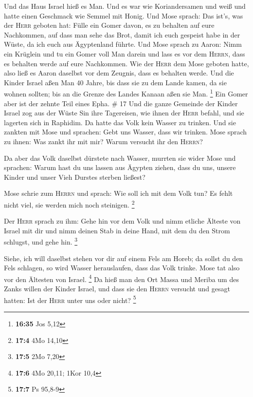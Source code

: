  Und das Haus Israel hieß es Man. Und es war wie
Koriandersamen und weiß und hatte einen Geschmack wie Semmel mit Honig.
 Und Mose sprach: Das ist's, was der \textsc{Herr}
geboten hat: Fülle ein Gomer davon, es zu behalten auf eure Nachkommen,
auf dass man sehe das Brot, damit ich euch gespeist habe in der Wüste,
da ich euch aus Ägyptenland führte.  Und Mose sprach zu
Aaron: Nimm ein Krüglein und tu ein Gomer voll Man darein und lass es
vor dem \textsc{Herrn}, dass es behalten werde auf eure Nachkommen.
 Wie der \textsc{Herr} dem Mose geboten hatte, also ließ
es Aaron daselbst vor dem Zeugnis, dass es behalten werde.
 Und die Kinder Israel aßen Man 40 Jahre, bis dass sie zu
dem Lande kamen, da sie wohnen sollten; bis an die Grenze des Landes
Kanaan aßen sie Man. \footnote{\textbf{16:35} Jos 5,12} 
Ein Gomer aber ist der zehnte Teil eines Epha. \# 17  Und
die ganze Gemeinde der Kinder Israel zog aus der Wüste Sin ihre
Tagereisen, wie ihnen der \textsc{Herr} befahl, und sie lagerten sich in
Raphidim. Da hatte das Volk kein Wasser zu trinken.  Und
sie zankten mit Mose und sprachen: Gebt uns Wasser, dass wir trinken.
Mose sprach zu ihnen: Was zankt ihr mit mir? Warum versucht ihr den
\textsc{Herrn}?

 Da aber das Volk daselbst dürstete nach Wasser, murrten
sie wider Mose und sprachen: Warum hast du uns lassen aus Ägypten
ziehen, dass du uns, unsere Kinder und unser Vieh Durstes sterben
ließest?

 Mose schrie zum \textsc{Herrn} und sprach: Wie soll ich
mit dem Volk tun? Es fehlt nicht viel, sie werden mich noch steinigen.
\footnote{\textbf{17:4} 4Mo 14,10}

 Der \textsc{Herr} sprach zu ihm: Gehe hin vor dem Volk
und nimm etliche Älteste von Israel mit dir und nimm deinen Stab in
deine Hand, mit dem du den Strom schlugst, und gehe hin. \footnote{\textbf{17:5}
  2Mo 7,20}

 Siehe, ich will daselbst stehen vor dir auf einem Fels am
Horeb; da sollst du den Fels schlagen, so wird Wasser herauslaufen, dass
das Volk trinke. Mose tat also vor den Ältesten von Israel. \footnote{\textbf{17:6}
  4Mo 20,11; 1Kor 10,4}  Da hieß man den Ort Massa und
Meriba um des Zanks willen der Kinder Israel, und dass sie den
\textsc{Herrn} versucht und gesagt hatten: Ist der \textsc{Herr} unter
uns oder nicht? \footnote{\textbf{17:7} Ps 95,8-9}

